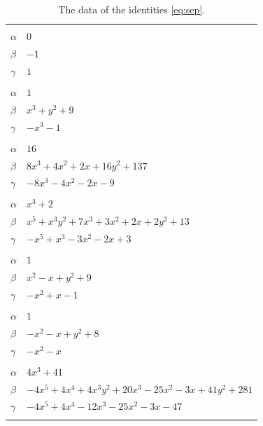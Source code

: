 \documentclass[11pt]{article}
\begin{document}
\begingroup\footnotesize
\setlength{\LTcapwidth}{\textwidth}
\begin{longtable}{@{}ll@{}}
\caption{The data of the identities \eqref{eq:sep}.}\label{tab:sep}\\
\hline\endfirsthead\hline\endhead\hline\endfoot
\multicolumn{2}{@{}l}{$\{i,j\}=\{0,3\}$, $k_{ij}=1$}\\
$\alpha$ & $0$\\
$\beta$ & $-1$\\
$\gamma$ & $1$\\
\addlinespace[3pt]
\multicolumn{2}{@{}l}{$\{i,j\}=\{0,4\}$, $k_{ij}=1$}\\
$\alpha$ & $1$\\
$\beta$ & $x^{3}+y^{2}+9$\\
$\gamma$ & $-x^{3}-1$\\
\addlinespace[3pt]
\multicolumn{2}{@{}l}{$\{i,j\}=\{0,11\}$, $k_{ij}=5^{2}$}\\
$\alpha$ & $16$\\
$\beta$ & $8x^{3}+4x^{2}+2x+16y^{2}+137$\\
$\gamma$ & $-8x^{3}-4x^{2}-2x-9$\\
\addlinespace[3pt]
\multicolumn{2}{@{}l}{$\{i,j\}=\{0,13\}$, $k_{ij}=5$}\\
$\alpha$ & $x^{3}+2$\\
$\beta$ & $x^{5}+x^{3}y^{2}+7x^{3}+3x^{2}+2x+2y^{2}+13$\\
$\gamma$ & $-x^{5}+x^{3}-3x^{2}-2x+3$\\
\addlinespace[3pt]
\multicolumn{2}{@{}l}{$\{i,j\}=\{0,14\}$, $k_{ij}=1$}\\
$\alpha$ & $1$\\
$\beta$ & $x^{2}-x+y^{2}+9$\\
$\gamma$ & $-x^{2}+x-1$\\
\addlinespace[3pt]
\multicolumn{2}{@{}l}{$\{i,j\}=\{0,16\}$, $k_{ij}=1$}\\
$\alpha$ & $1$\\
$\beta$ & $-x^{2}-x+y^{2}+8$\\
$\gamma$ & $-x^{2}-x$\\
\addlinespace[3pt]
\multicolumn{2}{@{}l}{$\{i,j\}=\{0,25\}$, $k_{ij}=3^{3}\cdot 5$}\\
$\alpha$ & $4x^{3}+41$\\
$\beta$ & $-4x^{5}+4x^{4}+4x^{3}y^{2}+20x^{3}-25x^{2}-3x+41y^{2}+281$\\
$\gamma$ & $-4x^{5}+4x^{4}-12x^{3}-25x^{2}-3x-47$\\
\addlinespace[3pt]
\multicolumn{2}{@{}l}{$\{i,j\}=\{1,5\}$, $k_{ij}=1$}\\

\end{longtable}
\end{document}
